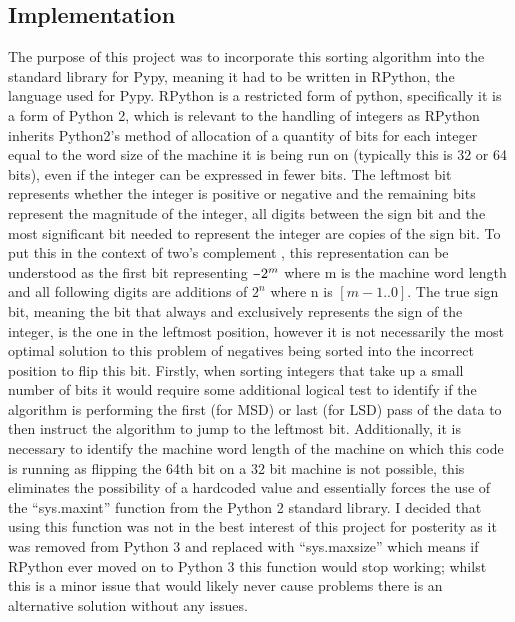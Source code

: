 \documentclass[12pt]{article}
\newcommand{\minus}{\scalebox{0.75}[1.0]{$-$}}
\begin{document}
	\subsection{Implementation}
  \label{ssec:negativesImplementation}
	The purpose of this project was to incorporate this sorting algorithm into the standard library for Pypy, meaning it had to be written in RPython, the language used for Pypy. RPython is a restricted form of python, specifically it is a form of Python 2, which is relevant to the handling of integers as RPython inherits Python2’s method of allocation of a quantity of bits for each integer equal to the word size of the machine it is being run on (typically this is 32 or 64 bits), even if the integer can be expressed in fewer bits. The leftmost bit represents whether the integer is positive or negative and the remaining bits represent the magnitude of the integer, all digits between the sign bit and the most significant bit needed to represent the integer are copies of the sign bit. To put this in the context of two’s complement , this representation can be understood as the first bit representing $\minus2^{m}$ where m is the machine word length and all following digits are additions of $2^{n}$ where n is $[m-1..0]$.
	\newline
	\newline
	The true sign bit, meaning the bit that always and exclusively represents the sign of the integer, is the one in the leftmost position, however it is not necessarily the most optimal solution to this problem of negatives being sorted into the incorrect position to flip this bit. Firstly, when sorting integers that take up a small number of bits it would require some additional logical test to identify if the algorithm is performing the first (for MSD) or last (for LSD) pass of the data to then instruct the algorithm to jump to the leftmost bit. Additionally, it is necessary to identify the machine word length of the machine on which this code is running as flipping the 64th bit on a 32 bit machine is not possible, this eliminates the possibility of a hardcoded value and essentially forces the use of the “sys.maxint” function from the Python 2 standard library. I decided that using this function was not in the best interest of this project for posterity as it was removed from Python 3 and replaced with “sys.maxsize” which means if RPython ever moved on to Python 3 this function would stop working; whilst this is a minor issue that would likely never cause problems there is an alternative solution without any issues.
	\newline
\end{document}
